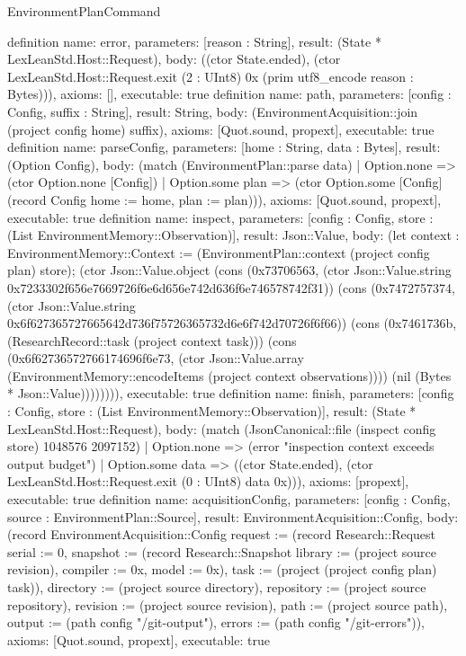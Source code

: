 \begin{lexlean}{EnvironmentPlanCommand}
\begin{semanticmodule}
definition{
 name: error, parameters: [reason : String], result: (State * LexLeanStd.Host::Request),
 body: ((ctor State.ended), (ctor LexLeanStd.Host::Request.exit (2 : UInt8) 0x (prim utf8_encode reason : Bytes))), axioms: [], executable: true
}
definition{
 name: path, parameters: [config : Config, suffix : String], result: String,
 body: (EnvironmentAcquisition::join (project config home) suffix), axioms: [Quot.sound, propext], executable: true
}
definition{
 name: parseConfig, parameters: [home : String, data : Bytes], result: (Option Config),
 body: (match (EnvironmentPlan::parse data) | Option.none => (ctor Option.none [Config]) | Option.some plan => (ctor Option.some [Config] (record Config {home := home, plan := plan}))), axioms: [Quot.sound, propext], executable: true
}
definition{
 name: inspect, parameters: [config : Config, store : (List EnvironmentMemory::Observation)], result: Json::Value,
 body: (let context : EnvironmentMemory::Context := (EnvironmentPlan::context (project config plan) store); (ctor Json::Value.object (cons (0x73706563, (ctor Json::Value.string 0x7233302f656e7669726f6e6d656e742d636f6e746578742f31)) (cons (0x7472757374, (ctor Json::Value.string 0x6f627365727665642d736f75726365732d6e6f742d70726f6f66)) (cons (0x7461736b, (ResearchRecord::task (project context task))) (cons (0x6f62736572766174696f6e73, (ctor Json::Value.array (EnvironmentMemory::encodeItems (project context observations)))) (nil (Bytes * Json::Value)))))))), executable: true
}
definition{
 name: finish, parameters: [config : Config, store : (List EnvironmentMemory::Observation)], result: (State * LexLeanStd.Host::Request),
 body: (match (JsonCanonical::file (inspect config store) 1048576 2097152) | Option.none => (error "inspection context exceeds output budget") | Option.some data => ((ctor State.ended), (ctor LexLeanStd.Host::Request.exit (0 : UInt8) data 0x))), axioms: [propext], executable: true
}
definition{
 name: acquisitionConfig, parameters: [config : Config, source : EnvironmentPlan::Source], result: EnvironmentAcquisition::Config,
 body: (record EnvironmentAcquisition::Config {request := (record Research::Request {serial := 0, snapshot := (record Research::Snapshot {library := (project source revision), compiler := 0x, model := 0x}), task := (project (project config plan) task)}), directory := (project source directory), repository := (project source repository), revision := (project source revision), path := (project source path), output := (path config "/git-output"), errors := (path config "/git-errors")}), axioms: [Quot.sound, propext], executable: true
}
\end{semanticmodule}
\end{lexlean}
